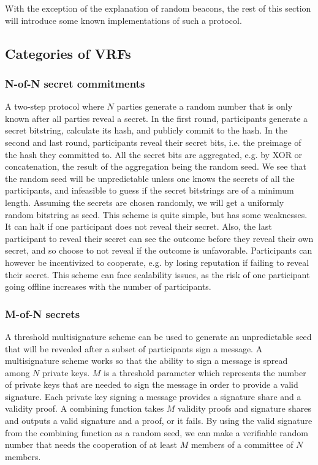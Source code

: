 With the exception of the explanation of random beacons, the rest of this section will introduce some known implementations of such a protocol.

\subsection{Categories of VRFs}

\subsubsection{N-of-N  secret commitments}
A two-step protocol where $N$ parties generate a random number that is only known after all parties reveal a secret.
In the first round, participants generate a secret bitstring, calculate its hash, and publicly commit to the hash. In the second and last round, participants reveal their secret bits, i.e. the preimage of the hash they committed to. All the secret bits are aggregated, e.g. by XOR or concatenation, the result of the aggregation being the random seed. We see that the random seed will be unpredictable unless one knows the secrets of all the participants, and infeasible to guess if the secret bitstrings are of a minimum length. Assuming the secrets are chosen randomly, we will get a uniformly random bitstring as seed.
This scheme is quite simple, but has some weaknesses. It can halt if one participant does not reveal their secret. Also, the last participant to reveal their secret can see the outcome before they reveal their own secret, and so choose to not reveal if the outcome is unfavorable. Participants can however be incentivized to cooperate, e.g. by losing reputation if failing to reveal their secret. This scheme can face scalability issues, as the risk of one participant going offline increases with the number of participants.

\subsubsection{M-of-N secrets}
A threshold multisignature scheme can be used to generate an unpredictable seed that will be revealed after a subset of participants sign a message.
A multisignature scheme works so that the ability to sign a message is spread among $N$ private keys. $M$ is a threshold parameter which represents the number of private keys that are needed to sign the message in order to provide a valid signature. Each private key signing a message provides a signature share and a validity proof. A combining function takes $M$ validity proofs and signature shares and outputs a valid signature and a proof, or it fails. By using the valid signature from the combining function as a random seed, we can make a verifiable random number that needs the cooperation of at least $M$ members of a committee of $N$ members.  

